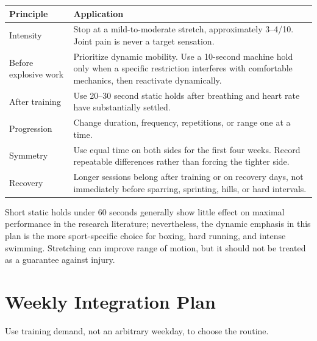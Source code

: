 \documentclass[10pt,letterpaper]{article}
\begin{document}
\begin{tabularx}{\textwidth}{@{}L{1.55in}Y@{}}
\toprule
{}
\color{white}\textbf{Principle} & \color{white}\textbf{Application} \\
\midrule
Intensity & Stop at a mild-to-moderate stretch, approximately 3--4/10. Joint pain is never a target sensation. \\
Before explosive work & Prioritize dynamic mobility. Use a 10-second machine hold only when a specific restriction interferes with comfortable mechanics, then reactivate dynamically. \\
After training & Use 20--30 second static holds after breathing and heart rate have substantially settled. \\
Progression & Change duration, frequency, repetitions, or range one at a time. \\
Symmetry & Use equal time on both sides for the first four weeks. Record repeatable differences rather than forcing the tighter side. \\
Recovery & Longer sessions belong after training or on recovery days, not immediately before sparring, sprinting, hills, or hard intervals. \\
\bottomrule
\end{tabularx}

Short static holds under 60 seconds generally show little effect on maximal performance in the research literature; nevertheless, the dynamic emphasis in this plan is the more sport-specific choice for boxing, hard running, and intense swimming. Stretching can improve range of motion, but it should not be treated as a guarantee against injury.

\section{Weekly Integration Plan}

Use training demand, not an arbitrary weekday, to choose the routine.
\end{document}
